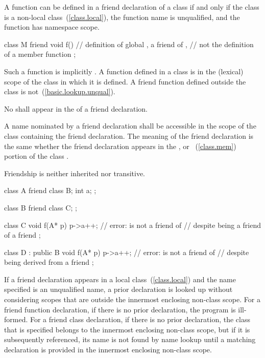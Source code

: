 \pnum
{}%
A function can be defined in a friend declaration of a class if and only if the
class is a non-local class~(\ref{class.local}), the function name is unqualified,
and the function has namespace scope.
\enterexample

\begin{codeblock}
class M {
  friend void f() { }           // definition of global , a friend of ,
                                // not the definition of a member function
};
\end{codeblock}
\exitexample

\pnum
Such a function is implicitly
.
A
function defined in a class is in the (lexical) scope of the class in which it is defined.
A friend function defined outside the class is not~(\ref{basic.lookup.unqual}).

\pnum
No
shall appear in the
of a friend declaration.

\pnum
{}%
A name nominated by a friend declaration shall be accessible in the scope of the
class containing the friend declaration.
The meaning of the friend declaration is the same whether the friend declaration
appears in the
,
or
~(\ref{class.mem})
portion of the class
.

\pnum
{}%
Friendship is neither inherited nor transitive.
\enterexample

\begin{codeblock}
class A {
  friend class B;
  int a;
};

class B {
  friend class C;
};

class C  {
  void f(A* p) {
    p->a++;         // error:  is not a friend of 
                    // despite being a friend of a friend
  }
};

class D : public B  {
  void f(A* p) {
    p->a++;         // error:  is not a friend of 
                    // despite being derived from a friend
  }
};
\end{codeblock}
\exitexample

\pnum
{}%
%
If a friend declaration appears in a local class~(\ref{class.local}) and the
name specified is an unqualified name, a prior declaration is looked
up without considering scopes that are outside the innermost enclosing
non-class scope.
For a friend function declaration, if there is no
prior declaration, the program is ill-formed.
For a friend class
declaration, if there is no prior declaration, the class that is
specified belongs to the innermost enclosing non-class scope, but if it is
subsequently referenced, its name is not found by name lookup
until a matching declaration is provided in the innermost enclosing
non-class scope.
\enterexample


